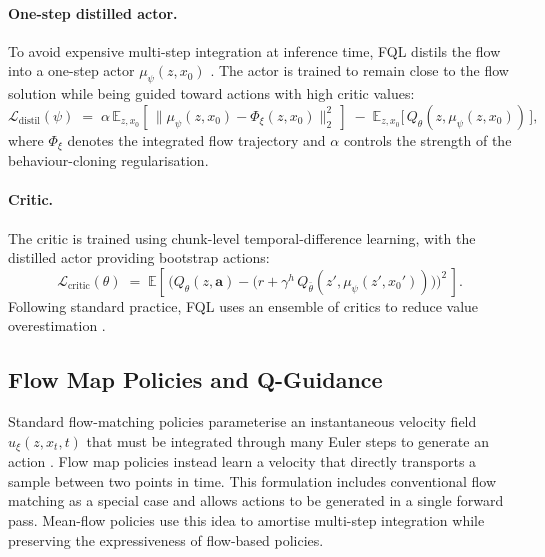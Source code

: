 \paragraph{One-step distilled actor.} To avoid expensive multi-step integration at inference time, FQL distils the flow into a one-step actor $\mu_\psi(z,x_0)$ \cite{park2025flowqlearning}. The actor is trained to remain close to the flow solution while being guided toward actions with high critic values:
\begin{equation}
    \mathcal{L}_{\text{distil}}(\psi) \;=\; \alpha\, \mathbb{E}_{z, x_0}\!\left[\,\|\mu_\psi(z, x_0) - \Phi_\xi(z, x_0)\|_2^2\,\right]\; -\; \mathbb{E}_{z, x_0}\!\big[\,Q_\theta(z, \mu_\psi(z, x_0))\,\big],
    \label{eq:fql-actor}
\end{equation}
where $\Phi_\xi$ denotes the integrated flow trajectory and $\alpha$ controls the strength of the behaviour-cloning regularisation.

\paragraph{Critic.} The critic is trained using chunk-level temporal-difference learning, with the distilled actor providing bootstrap actions:
\begin{equation}
    \mathcal{L}_{\text{critic}}(\theta) \;=\; \mathbb{E}\!\left[\,\Big(Q_\theta(z, \mathbf{a}) - \big(r + \gamma^{h}\, Q_{\bar\theta}(z', \mu_\psi(z', x_0'))\big)\Big)^2\,\right].
    \label{eq:fql-critic}
\end{equation}
Following standard practice, FQL uses an ensemble of critics to reduce value overestimation \cite{hasselt2010double,haarnoja2018softactorcriticoffpolicymaximum}.

\subsection{Flow Map Policies and Q-Guidance}
\label{sec:fmq-bg}

Standard flow-matching policies parameterise an instantaneous velocity field $u_\xi(z,x_t,t)$ that must be integrated through many Euler steps to generate an action \cite{lipman2023flowmatchinggenerativemodeling}. Flow map policies \cite{ziakas2026aligningflowmappolicies} instead learn a velocity that directly transports a sample between two points in time.
This formulation includes conventional flow matching as a special case and allows actions to be generated in a single forward pass. Mean-flow policies \cite{ziakas2026aligningflowmappolicies} use this idea to amortise multi-step integration while preserving the expressiveness of flow-based policies.

